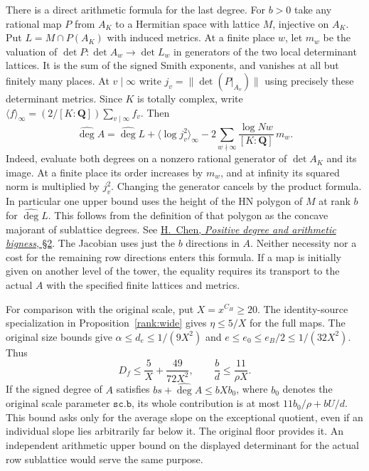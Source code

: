 There is a direct arithmetic formula for the last degree. For \(b>0\)
take any rational map \(P\) from \(A_K\) to a Hermitian space with
lattice \(M\), injective on \(A_K\). Put \(L=M\cap P(A_K)\) with
induced metrics. At a finite place \(w\), let \(m_w\) be the
valuation of \(\det P:\det A_w\to\det L_w\) in generators of the
two local determinant lattices. It is the sum of the signed Smith
exponents, and vanishes at all but finitely many places. At \(v\mid
\infty\) write \(j_v=\|\det(P|_{A_v})\|\) using precisely these
determinant metrics. Since \(K\) is totally complex, write
\(\langle f\rangle_\infty=(2/[K:\mathbf Q])\sum_{v\mid\infty}f_v\).
Then
\[
 \widehat{\deg}A=\widehat{\deg}L+
      \big\langle \log j_v^2\big\rangle_\infty
          -2\sum_{w\nmid\infty}
                 \frac{\log Nw}{[K:\mathbf Q]}\,m_w .
\]
Indeed, evaluate both degrees on a nonzero rational generator of
\(\det A_K\) and its image. At a finite place its order increases
by \(m_w\), and at infinity its squared norm is multiplied by
\(j_v^2\). Changing the generator cancels by the product formula.
In particular one upper bound uses the height of the HN polygon of
\(M\) at rank \(b\) for \(\widehat{\deg}L\). This follows from the
definition of that polygon as the concave majorant of sublattice
degrees. See \href{https://arxiv.org/abs/0803.2583}{H.~Chen,
\emph{Positive degree and arithmetic bigness}, \S2}.
The Jacobian uses just the \(b\) directions in \(A\). Neither
necessity nor a cost for the remaining row directions enters this
formula. If a map is initially given on another level of the tower,
the equality requires its transport to the actual \(A\) with the
specified finite lattices and metrics.

For comparison with the original scale, put \(X=x^{C_H}\ge20\).
The identity-source specialization in Proposition~\ref{rank:wide}
gives \(\eta\le5/X\) for the full maps. The original size bounds
give \(\alpha\le d_e\le1/(9X^2)\) and
\(e\le e_0\le e_B/2\le1/(32X^2)\). Thus
\[
    D_f\le \frac5X+\frac{49}{72X^2},\qquad
    \frac bd\le \frac{11}{\rho X}.
\]
If the signed degree of \(A\) satisfies \(bs+\widehat{\deg}A\le
bXb_0\), where \(b_0\) denotes the original scale parameter
\(\mathtt{sc.b}\), its whole contribution is at most
\(11b_0/\rho + bU/d\). This bound asks only for the average slope
on the exceptional quotient, even if an individual slope lies
arbitrarily far below it. The original floor provides it. An
independent arithmetic upper bound on the displayed determinant
for the actual row sublattice would serve the same purpose.


